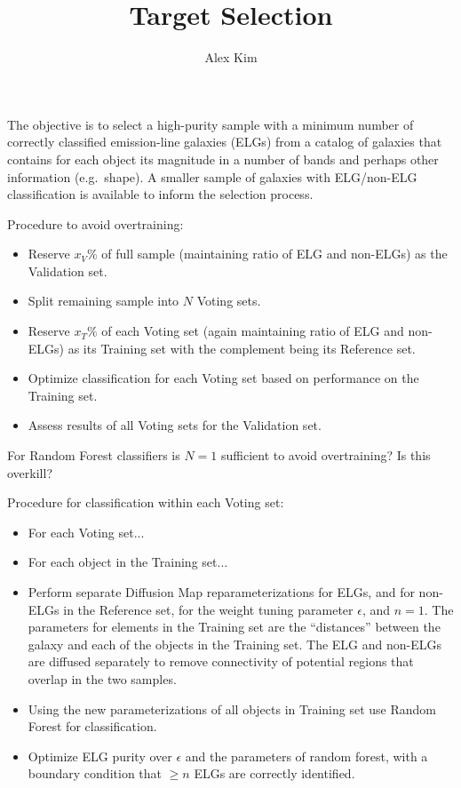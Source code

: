 \documentclass[preprint]{aastex}
\begin{document}
\title{Target Selection}
\author{Alex Kim}

The objective is to select a high-purity sample with a minimum number of correctly classified emission-line galaxies (ELGs) from a catalog of galaxies that contains for each object
its magnitude in a number of bands and perhaps other information (e.g.\ shape).  A smaller sample of galaxies with ELG/non-ELG classification is available to
inform the selection process.

Procedure to avoid overtraining:
\begin{itemize}
\item Reserve $x_V\%$ of full sample (maintaining ratio of ELG and non-ELGs) as the Validation set.
\item Split remaining sample into $N$ Voting sets.
\item Reserve $x_T\%$ of each Voting set  (again maintaining ratio of ELG and non-ELGs) as its Training set with the complement being its Reference set.
\item Optimize classification for each Voting set based on performance on the Training set. 
\item Assess results of all Voting sets for the Validation set.
\end{itemize}
For Random Forest classifiers is $N=1$ sufficient to avoid overtraining?  Is this overkill?

Procedure for classification within each Voting set:
\begin{itemize}
\item For each Voting set...
\item   For each object in the Training set...
\item     Perform separate Diffusion Map reparameterizations for ELGs, and for non-ELGs in the Reference set, for the weight tuning parameter $\epsilon$, and $n=1$.
The parameters for elements in the Training set are the ``distances'' between the galaxy and each of the objects in the Training set.  The ELG and non-ELGs are
diffused separately to remove connectivity of potential regions that overlap in the two samples.
\item Using the new parameterizations of all objects in Training set use Random Forest for classification.
\item Optimize ELG purity over $\epsilon$ and the parameters of random forest, with a boundary condition that $\ge n$ ELGs are correctly identified.
\end{itemize}
\end{document}
